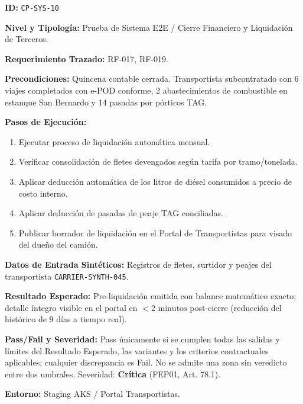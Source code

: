 \par\noindent\textbf{ID:} \texttt{C\allowbreak{}P\allowbreak{}-\allowbreak{}S\allowbreak{}Y\allowbreak{}S\allowbreak{}-\allowbreak{}1\allowbreak{}0\allowbreak{}}\par
\par\noindent\textbf{Nivel y Tipología:} Prueba de Sistema E2E / Cierre Financiero y Liquidación de Terceros.\par
\par\noindent\textbf{Requerimiento Trazado:} RF-017, RF-019.\par
\par\noindent\textbf{Precondiciones:} Quincena contable cerrada. Transportista subcontratado con 6 viajes completados con e-POD conforme, 2 abastecimientos de combustible en estanque San Bernardo y 14 pasadas por pórticos TAG.\par
\par\noindent\textbf{Pasos de Ejecución:} \par
\begin{enumerate}
\item Ejecutar proceso de liquidación automática mensual.
\item Verificar consolidación de fletes devengados según tarifa por tramo/tonelada.
\item Aplicar deducción automática de los litros de diésel consumidos a precio de costo interno.
\item Aplicar deducción de pasadas de peaje TAG conciliadas.
\item Publicar borrador de liquidación en el Portal de Transportistas para visado del dueño del camión.
\end{enumerate}
\par\noindent\textbf{Datos de Entrada Sintéticos:} Registros de fletes, surtidor y peajes del transportista \texttt{C\allowbreak{}A\allowbreak{}R\allowbreak{}R\allowbreak{}I\allowbreak{}E\allowbreak{}R\allowbreak{}-\allowbreak{}S\allowbreak{}Y\allowbreak{}N\allowbreak{}T\allowbreak{}H\allowbreak{}-\allowbreak{}0\allowbreak{}4\allowbreak{}5\allowbreak{}}.\par
\par\noindent\textbf{Resultado Esperado:} Pre-liquidación emitida con balance matemático exacto; detalle íntegro visible en el portal en \(< 2\text{ minutos}\) post-cierre (reducción del histórico de 9 días a tiempo real).\par
\par\noindent\textbf{Pass/Fail y Severidad:} Pass únicamente si se cumplen todas las salidas y límites del Resultado Esperado, las variantes y los criterios contractuales aplicables; cualquier discrepancia es Fail. No se admite una zona sin veredicto entre dos umbrales. Severidad: \textbf{Crítica} (FEP01, Art. 78.1).\par
\par\noindent\textbf{Entorno:} Staging AKS / Portal Transportistas.\par







